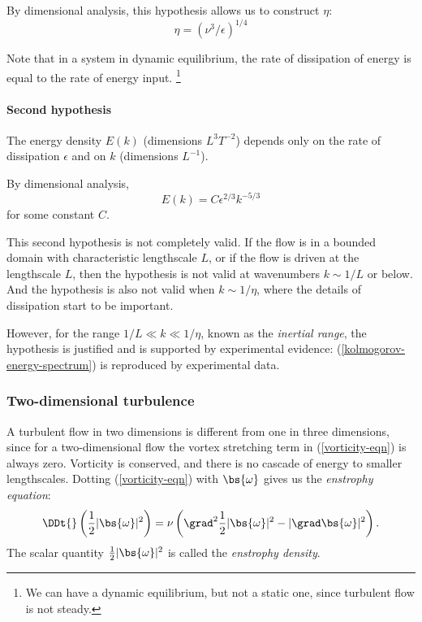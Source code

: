 By dimensional analysis, this hypothesis allows us to construct $\eta$:
\begin{equation}
    \eta = (\nu^3 / \epsilon)^{1/4}
\end{equation}

Note that in a system in dynamic equilibrium, the rate of dissipation of energy is equal to the rate of energy input.
\footnote{We can have a dynamic equilibrium, but not a static one, since turbulent flow is not steady.}

\paragraph{Second hypothesis} The energy density $E(k)$ (dimensions $L^3
T^{-2}$) depends only on the rate of dissipation $\epsilon$ and on $k$
(dimensions $L^{-1}$).

By dimensional analysis,
\begin{equation}
    E(k) = C \epsilon^{2/3} k^{-5/3}
    \label{kolmogorov-energy-spectrum}
\end{equation}
for some constant $C$.

This second hypothesis is not completely valid. If the flow is in a bounded
domain with characteristic lengthscale $L$, or if the flow is driven at the
lengthscale $L$, then the hypothesis is not valid at wavenumbers $k\sim1/L$ or
below. And the hypothesis is also not valid when $k\sim1/\eta$, where the
details of dissipation start to be important.

However, for the range $1/L\ll k\ll 1/\eta$, known as the \textit{inertial
range}, the hypothesis is justified and is supported by experimental evidence:
(\ref{kolmogorov-energy-spectrum}) is reproduced by experimental data. 

\subsubsection{Two-dimensional turbulence}

A turbulent flow in two dimensions is different from one in three dimensions,
since for a two-dimensional flow the vortex stretching term in
(\ref{vorticity-eqn}) is always zero. Vorticity is conserved, and there is no
cascade of energy to smaller lengthscales. Dotting (\ref{vorticity-eqn}) with
$\bs{\omega}$ gives us the \textit{enstrophy equation}:
\begin{equation}
    \DDt{}\left(\frac{1}{2}|\bs{\omega}|^2\right) 
    = \nu\left(\grad^2\frac{1}{2}|\bs{\omega}|^2 - |\grad\bs{\omega}|^2\right).
 \label{enstrophy-eqn}
\end{equation}
The scalar quantity $\frac{1}{2}|\bs{\omega}|^2$ is called the
\textit{enstrophy density}. 


